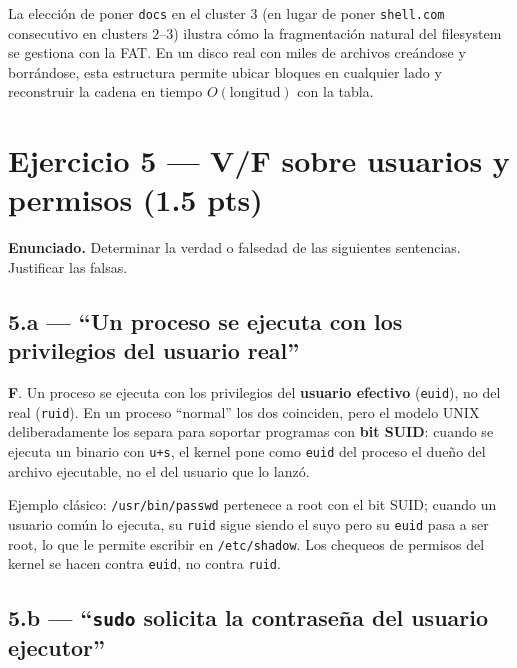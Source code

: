 \documentclass[11pt,a4paper]{article}
\begin{document}
\begin{idea}
La elección de poner \texttt{docs} en el cluster $3$ (en lugar de
poner \texttt{shell.com} consecutivo en clusters $2$--$3$) ilustra
cómo la fragmentación natural del filesystem se gestiona con la FAT.
En un disco real con miles de archivos creándose y borrándose, esta
estructura permite ubicar bloques en cualquier lado y reconstruir la
cadena en tiempo $O(\text{longitud})$ con la tabla.
\end{idea}

\section{Ejercicio 5 --- V/F sobre usuarios y permisos (1.5 pts)}

\textbf{Enunciado.} Determinar la verdad o falsedad de las siguientes
sentencias. Justificar las falsas.

\subsection*{5.a --- ``Un proceso se ejecuta con los privilegios del
usuario real''}

\begin{respuesta}
\textbf{F}. Un proceso se ejecuta con los privilegios del
\textbf{usuario efectivo} (\texttt{euid}), no del real
(\texttt{ruid}). En un proceso ``normal'' los dos coinciden, pero el
modelo UNIX deliberadamente los separa para soportar programas con
\textbf{bit SUID}: cuando se ejecuta un binario con \texttt{u+s}, el
kernel pone como \texttt{euid} del proceso el dueño del archivo
ejecutable, no el del usuario que lo lanzó.

Ejemplo clásico: \texttt{/usr/bin/passwd} pertenece a root con el bit
SUID; cuando un usuario común lo ejecuta, su \texttt{ruid} sigue
siendo el suyo pero su \texttt{euid} pasa a ser root, lo que le
permite escribir en \texttt{/etc/shadow}. Los chequeos de permisos
del kernel se hacen contra \texttt{euid}, no contra \texttt{ruid}.
\end{respuesta}

\subsection*{5.b --- ``\texttt{sudo} solicita la contraseña del
usuario ejecutor''}
\end{document}
